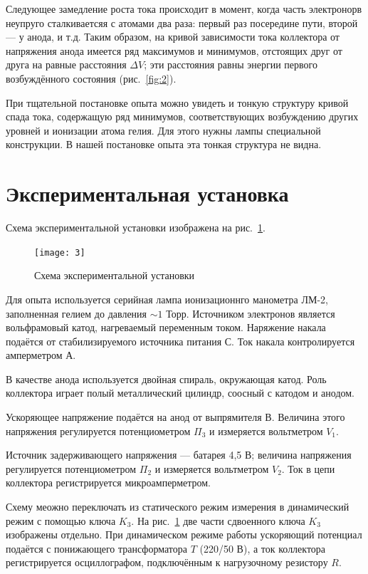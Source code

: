 \documentclass[a4paper]{article}
\begin{document}
Следующее замедление роста тока происходит в момент, когда часть
электронорв неупруго сталкиваетсяя с атомами два раза: первый
раз посередине пути, второй --- у анода, и т.д. Таким образом, на
кривой зависимости тока коллектора от напряжения анода имеется
ряд максимумов и минимумов, отстоящих друг от друга на равные
расстояния $\Delta V$; эти расстояния равны энергии первого
возбуждённого состояния (рис.~\ref{fig:2}).

При тщательной постановке опыта можно увидеть и тонкую структуру
кривой спада тока, содержащую ряд минимумов, соответствующих
возбуждению других уровней и ионизации атома гелия. Для этого
нужны лампы специальной конструкции. В нашей постановке опыта
эта тонкая структура не видна.

\section{Экспериментальная установка}
Схема экспериментальной установки изображена на рис.~\ref{fig:3}.
\begin{figure}[ht]
	\centering
	\texttt{[image: 3]}
	\caption{Схема экспериментальной установки}
	\label{fig:3}
\end{figure}
Для опыта используется серийная лампа ионизационнго манометра ЛМ-2,
заполненная гелием до давления $\sim 1$ Торр. Источником электронов
является вольфрамовый катод, нагреваемый переменным током. Наряжение
накала подаётся от стабилизируемого источника питания С. Ток
накала контролируется амперметром А.

В качестве анода используется двойная спираль, окружающая катод.
Роль коллектора играет полый металлический цилиндр, соосный с катодом
и анодом.

Ускоряющее напряжение подаётся на анод от выпрямителя В. Величина
этого напряжения регулируется потенциометром $\Pi_3$ и измеряется
вольтметром $V_1$. 

Источник задерживающего напряжения --- батарея 4,5 В; величина
напряжения регулируется потенциометром $\Pi_2$ и измеряется
вольтметром $V_2$. Ток в цепи коллектора регистрируется микроамперметром.

Схему меожно переключать из статического режим измерения в
динамический режим с помощью ключа $K_3$. На рис.~\ref{fig:3} две
части сдвоенного ключа $K_3$ изображены отдельно. При динамическом
режиме работы ускоряющий потенциал подаётся с понижающего
трансформатора $T$ (220/50 В), а ток коллектора регистрируется
осциллографом, подключённым к нагрузочному резистору $R$.
\end{document}
